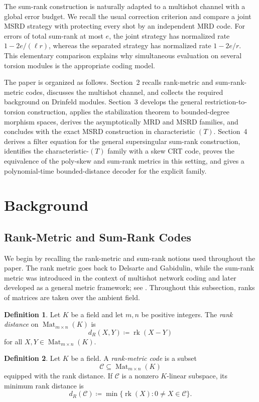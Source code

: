\documentclass[10pt,a4paper]{amsart}
\DeclareMathOperator{\Mat}{Mat}
\DeclareMathOperator{\rk}{rk}
\theoremstyle{definition}
\newtheorem{definition}{Definition}[section]
\theoremstyle{plain}
\theoremstyle{remark}
\begin{document}
The sum-rank construction is naturally adapted to a multishot channel with a
global error budget.  We recall the usual correction criterion and compare a
joint MSRD strategy with protecting every shot by an independent MRD code.
For errors of total sum-rank at most $e$, the joint strategy has normalized
rate $1-2e/(\ell r)$, whereas the separated strategy has normalized rate
$1-2e/r$.  This elementary comparison explains why simultaneous evaluation
on several torsion modules is the appropriate coding model.

The paper is organized as follows.  Section~2 recalls rank-metric and
sum-rank-metric codes, discusses the multishot channel, and collects the
required background on Drinfeld modules.  Section~3 develops the general
restriction-to-torsion construction, applies the stabilization theorem to
bounded-degree morphism spaces, derives the asymptotically MRD and MSRD
families, and concludes with the exact MSRD construction in characteristic
$(T)$.  Section~4 derives a filter equation for the general supersingular
sum-rank construction, identifies the characteristic-$(T)$ family with a
skew CRT code, proves the equivalence of the poly-skew and sum-rank metrics
in this setting, and gives a polynomial-time bounded-distance decoder for the
explicit family.

\section{Background}

\subsection{Rank-Metric and Sum-Rank Codes}

We begin by recalling the rank-metric and sum-rank notions used throughout the paper. The rank metric goes back to Delsarte and Gabidulin, while the sum-rank metric was introduced in the context of multishot network coding and later developed as a general metric framework; see \cite{Del78,Gab85,NU10,MtP18,MtP19}. Throughout this subsection, ranks of matrices are taken over the ambient field.

\begin{definition}
Let $K$ be a field and let $m,n$ be positive integers. The \emph{rank distance} on $\Mat_{m\times n}(K)$ is
$$
d_R(X,Y)\coloneqq \rk(X-Y)
$$
for all $X,Y\in \Mat_{m\times n}(K)$.
\end{definition}

\begin{definition}
Let $K$ be a field. A \emph{rank-metric code} is a subset
$$
\mathcal C\subseteq \Mat_{m\times n}(K)
$$
equipped with the rank distance. If $\mathcal C$ is a nonzero $K$-linear subspace, its minimum rank distance is
$$
d_R(\mathcal C)
\coloneqq
\min\{\rk(X):0\neq X\in\mathcal C\}.
$$
\end{definition}
\end{document}
